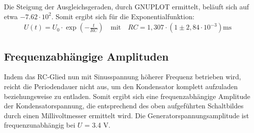 Die Steigung der Ausgleichsgeraden, durch GNUPLOT ermittelt, beläuft sich auf etwa $-7.62 \cdot 10^2$. Somit ergibt sich für die Exponentialfunktion:
\begin{align}
U(t) = U_0 \cdot \exp(-\frac{t}{RC}) \quad \text{mit} \quad RC = 1,307\cdot (1\pm 2,84 \cdot 10^{-3}) \text{ms}
\end{align}

\subsection{Frequenzabhängige Amplituden}
Indem das RC-Glied nun mit Sinusspannung höherer Frequenz betrieben wird, reicht die Periodendauer nicht aus, um 
den Kondensator komplett aufzuladen beziehungsweise zu entladen. Somit ergibt sich eine frequenzabhängige Amplitude der 
Kondensatorspannung, die entsprechend des oben aufgeführten Schaltbildes durch einen Millivoltmesser ermittelt wird. 
Die Generatorspannungsamplitude ist frequenzunabhängig bei \hspace{5cm} $U$ = 3.4 V. 

